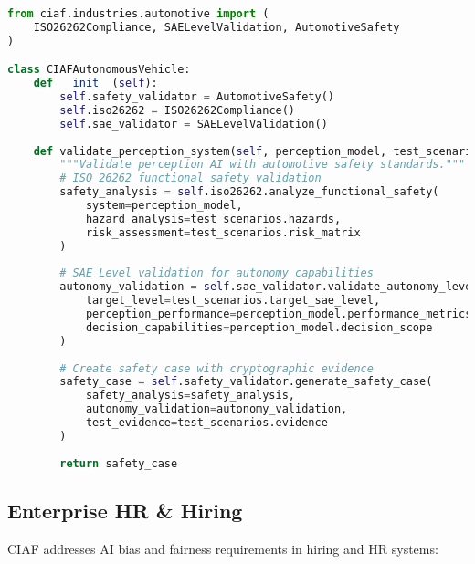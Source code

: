 \documentclass[12pt,a4paper]{article}
\begin{document}
\begin{lstlisting}[language=Python, caption=Autonomous Vehicle Safety Implementation]
from ciaf.industries.automotive import (
    ISO26262Compliance, SAELevelValidation, AutomotiveSafety
)

class CIAFAutonomousVehicle:
    def __init__(self):
        self.safety_validator = AutomotiveSafety()
        self.iso26262 = ISO26262Compliance()
        self.sae_validator = SAELevelValidation()
    
    def validate_perception_system(self, perception_model, test_scenarios):
        """Validate perception AI with automotive safety standards."""
        # ISO 26262 functional safety validation
        safety_analysis = self.iso26262.analyze_functional_safety(
            system=perception_model,
            hazard_analysis=test_scenarios.hazards,
            risk_assessment=test_scenarios.risk_matrix
        )
        
        # SAE Level validation for autonomy capabilities
        autonomy_validation = self.sae_validator.validate_autonomy_level(
            target_level=test_scenarios.target_sae_level,
            perception_performance=perception_model.performance_metrics,
            decision_capabilities=perception_model.decision_scope
        )
        
        # Create safety case with cryptographic evidence
        safety_case = self.safety_validator.generate_safety_case(
            safety_analysis=safety_analysis,
            autonomy_validation=autonomy_validation,
            test_evidence=test_scenarios.evidence
        )
        
        return safety_case
\end{lstlisting}

\subsection{Enterprise HR \& Hiring}

CIAF addresses AI bias and fairness requirements in hiring and HR systems:
\end{document}

